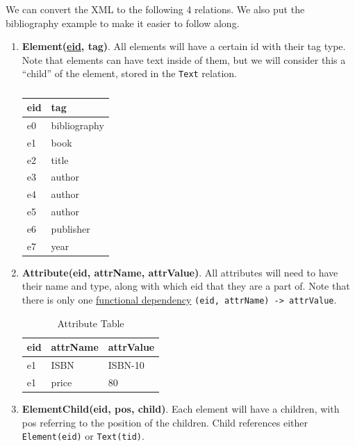   We can convert the XML to the following 4 relations. We also put the bibliography example to make it easier to follow along. 
  \begin{enumerate}
    \item \textbf{Element(\underline{eid}, tag)}. All elements will have a certain id with their tag type. Note that elements can have text inside of them, but we will consider this a ``child'' of the element, stored in the \texttt{Text} relation. 

      \begin{table}[H]
        \centering
        \caption{Element Table}
        \begin{tabular}{|l|l|}
          \hline
          \textbf{eid} & \textbf{tag} \\
          \hline
          e0 & bibliography \\
          e1 & book \\
          e2 & title \\
          e3 & author \\
          e4 & author \\
          e5 & author \\
          e6 & publisher \\
          e7 & year \\
          \hline
        \end{tabular}
        \caption{}
        \label{tab:}
      \end{table}

    \item \textbf{Attribute(eid, attrName, attrValue)}. All attributes will need to have their name and type, along with which eid that they are a part of. Note that there is only one \hyperref[def:functional-dependency]{functional dependency} \texttt{(eid, attrName) -> attrValue}.

      \begin{table}[H]
        \centering
        \caption{Attribute Table}
        \begin{tabular}{|l|l|l|}
        \hline
        \textbf{eid} & \textbf{attrName} & \textbf{attrValue} \\
        \hline
        e1 & ISBN & ISBN-10 \\
        e1 & price & 80 \\
        \hline
        \end{tabular}
      \end{table}

    \item \textbf{ElementChild(eid, pos, child)}. Each element will have a children, with pos referring to the position of the children. Child references either \texttt{Element(eid)} or \texttt{Text(tid)}. 


\end{enumerate}
